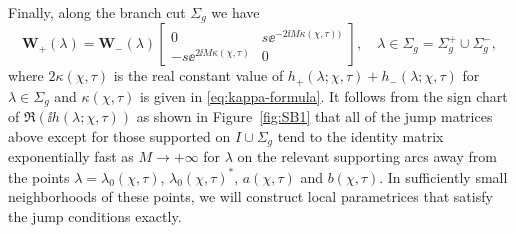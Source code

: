 Finally, along the branch cut $\Sigma_g$ we have
\begin{equation}
\mathbf{W}_{+}(\lambda) = \mathbf{W}_{-}(\lambda)
\begin{bmatrix} 0 & s  \ee^{-2\ii M \kappa(\chi,\tau))} \\ -s  \ee^{2 \ii M \kappa(\chi,\tau)} & 0 \end{bmatrix},\quad \lambda\in \Sigma_g = \Sigma_g^+ \cup \Sigma_g^-,
\label{eq:W-jump-Sigma-g}
\end{equation}
where $2\kappa(\chi,\tau)$ is the real constant value of $h_{+}(\lambda;\chi,\tau)+h_{-}(\lambda;\chi,\tau)$ for $\lambda\in\Sigma_g$ and $\kappa(\chi,\tau)$ is given in \eqref{eq:kappa-formula}. 
It follows from the sign chart of $\Re(\ii h(\lambda;\chi,\tau))$ as shown in Figure~\ref{fig:SB1} that all of the jump matrices above except for those supported on $I\cup\Sigma_g$ tend to the identity matrix exponentially fast as $M\to +\infty$ for $\lambda$ on the relevant supporting arcs away from the points $\lambda = \lambda_{0}(\chi,\tau)$, $\lambda_{0}(\chi,\tau)^{*}$, $a(\chi,\tau)$ and $b(\chi,\tau)$. In sufficiently small neighborhoods of these points, we will construct local parametrices that satisfy the jump conditions exactly.


